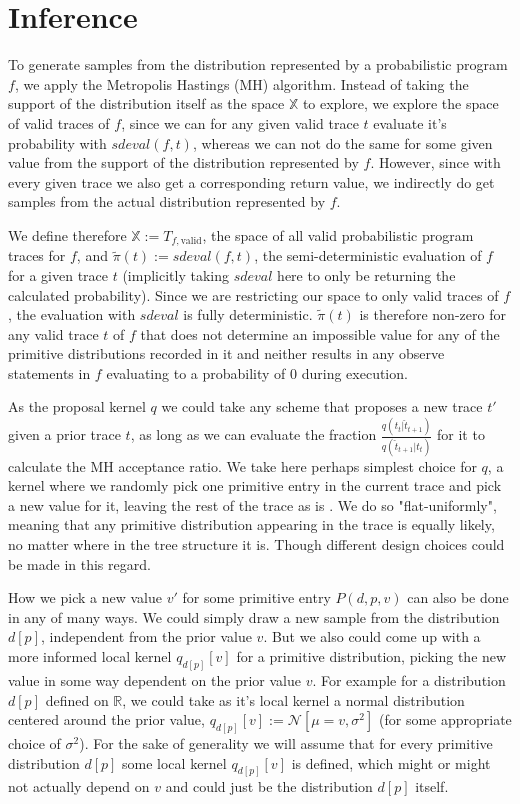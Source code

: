 \section{Inference}

To generate samples from the distribution represented by a probabilistic program $f$, we apply the Metropolis Hastings (MH) algorithm. Instead of taking the support of the distribution itself as the space $\mathbb{X}$ to explore, we explore the space of valid traces of $f$, since we can for any given valid trace $t$ evaluate it's probability with $sdeval(f,t)$, whereas we can not do the same for some given value from the support of the distribution represented by $f$. However, since with every given trace we also get a corresponding return value, we indirectly do get samples from the actual distribution represented by $f$.

We define therefore $\mathbb{X} := T_{f,\text{valid}}$, the space of all valid probabilistic program traces for $f$, and $\tilde{\pi}(t) := sdeval(f,t)$, the semi-deterministic evaluation of $f$ for a given trace $t$ (implicitly taking $sdeval$ here to only be returning the calculated probability). Since we are restricting our space to only valid traces of $f$, the evaluation with $sdeval$ is fully deterministic. $\tilde{\pi}(t)$ is therefore non-zero for any valid trace $t$ of $f$ that does not determine an impossible value for any of the primitive distributions recorded in it and neither results in any observe statements in $f$ evaluating to a probability of $0$ during execution.

As the proposal kernel $q$ we could take any scheme that proposes a new trace $t'$ given a prior trace $t$, as long as we can evaluate the fraction $\frac{q(t_t | \hat{t}_{t+1})}{q(\hat{t}_{t+1} | t_t)}$ for it to calculate the MH acceptance ratio. We take here perhaps simplest choice for $q$, a kernel where we randomly pick one primitive entry in the current trace and pick a new value for it, leaving the rest of the trace as is \cite{wingate2011lightweight}. We do so "flat-uniformly", meaning that any primitive distribution appearing in the trace is equally likely, no matter where in the tree structure it is. Though different design choices could be made in this regard.

How we pick a new value $v'$ for some primitive entry $P(d,p,v)$ can also be done in any of many ways. We could simply draw a new sample from the distribution $d[p]$, independent from the prior value $v$. But we also could come up with a more informed local kernel $q_{d[p]}[v]$ for a primitive distribution, picking the new value in some way dependent on the prior value $v$. For example for a distribution $d[p]$ defined on $\mathbb{R}$, we could take as it's local kernel a normal distribution centered around the prior value, $q_{d[p]}[v] := \mathcal{N}[\mu = v, \sigma^2]$ (for some appropriate choice of $\sigma^2$). For the sake of generality we will assume that for every primitive distribution $d[p]$ some local kernel $q_{d[p]}[v]$ is defined, which might or might not actually depend on $v$ and could just be the distribution $d[p]$ itself.

